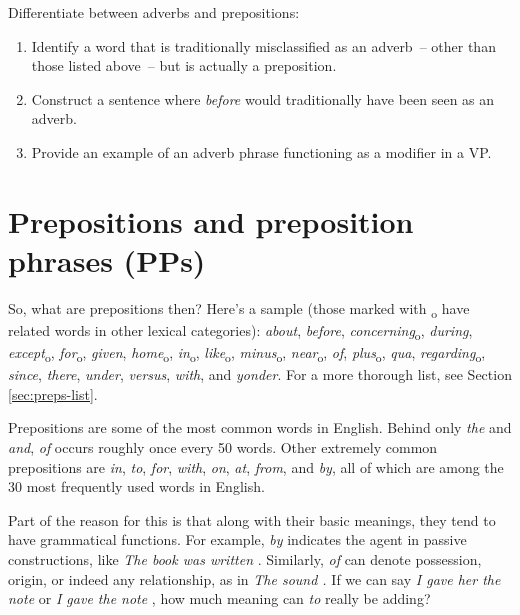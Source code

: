 \begin{tcolorbox}[title=Practice, colback=white]
Differentiate between adverbs and prepositions:
\begin{enumerate}
    \item Identify a word that is traditionally misclassified as an adverb~-- other than those listed above~-- but is actually a preposition.
    \item Construct a sentence where \textit{before} would traditionally have been seen as an adverb.
    \item Provide an example of an adverb phrase functioning as a modifier in a VP.
\end{enumerate}
\end{tcolorbox}

\section{Prepositions and preposition phrases (PPs)} \label{sec:prepositions}

So, what are prepositions then? Here's a sample (those marked with \textsubscript{o} have related words in other lexical categories):
\textit{about}, \textit{before}, \textit{concerning}\textsubscript{o}, \textit{during}, \textit{except}\textsubscript{o}, \textit{for}\textsubscript{o}, \textit{given}, \textit{home}\textsubscript{o}, \textit{in}\textsubscript{o}, \textit{like}\textsubscript{o}, \textit{minus}\textsubscript{o}, \textit{near}\textsubscript{o}, \textit{of}, \textit{plus}\textsubscript{o}, \textit{qua}, \textit{regarding}\textsubscript{o}, \textit{since}, \textit{there}, \textit{under}, \textit{versus}, \textit{with}, and \textit{yonder}. For a more thorough list, see Section \ref{sec:preps-list}.


Prepositions are some of the most common words in English. Behind only \textit{the} and \textit{and}, \textit{of} occurs roughly once every 50 words. Other extremely common prepositions are \textit{in}, \textit{to}, \textit{for}, \textit{with}, \textit{on}, \textit{at}, \textit{from}, and \textit{by}, all of which are among the 30 most frequently used words in English. 

Part of the reason for this is that along with their basic meanings, they tend to have grammatical functions. For example, \textit{by} indicates the agent in passive constructions, like \textit{The book was written }. Similarly, \textit{of} can denote possession, origin, or indeed any relationship, as in \textit{The sound .} If we can say \textit{I gave her the note} or \textit{I gave the note }, how much meaning can \textit{to} really be adding?

